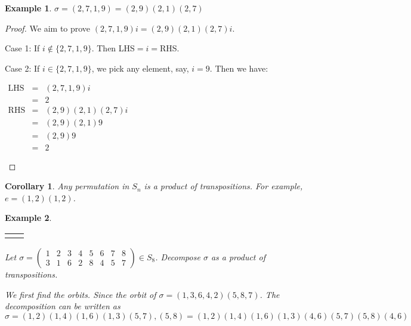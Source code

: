 \documentclass{article}
\theoremstyle{MyNonumberplain}
\theoremstyle{break}
\newtheorem*{proof}{Proof. }
\newcommand{\nline}{\begin{tabular}{ll}&\\\end{tabular}}
\newcommand{\nin}{\not\in}
\newcommand{\tmop}{\text}
\theoremstyle{break}
\newtheorem{corollary}{Corollary}[theorem]
\newtheorem{example}{Example}[section]
\theoremstyle{break}
\theoremstyle{definition}
\theoremstyle{break}
\begin{document}
\begin{expbox}
    \begin{example}
        $\sigma = (2, 7, 1, 9) = (2, 9) (2, 1) (2, 7)$
    \end{example}
    \begin{prfbox}
        \begin{proof}
            We aim to prove $(2, 7, 1, 9) i = (2, 9) (2, 1) (2, 7) i$.\bigskip

            Case 1: If $i \nin  \{ 2, 7, 1, 9 \}$. Then LHS$=i=$RHS.\bigskip

            Case 2: If $i \in \{ 2, 7, 1, 9 \}$, we pick any element, say, $i=9$. Then we have:\bigskip

            \begin{center}
                $\begin{array}{lll}
                    \tmop{LHS} & = & (2, 7, 1, 9) i\\
                    & = & 2\\
                    \tmop{RHS} & = & (2, 9) (2, 1) (2, 7) i\\
                    & = & (2, 9) (2, 1) 9\\
                    & = & (2, 9) 9\\
                    & = & 2
                \end{array}$
            \end{center}
        \end{proof}
    \end{prfbox}
\end{expbox}

\begin{thmbox}
    \begin{corollary}
        Any permutation in $S_n$ is a product of transpositions. For example, $e=(1,2)(1,2)$.
    \end{corollary}
\end{thmbox}

\begin{expbox}
    \begin{example}

        \nline

        Let $\sigma = \left(\begin{array}{cccccccc}
            1 & 2 & 3 & 4 & 5 & 6 & 7 & 8\\
            3 & 1 & 6 & 2 & 8 & 4 & 5 & 7
        \end{array}\right) \in S_8$. Decompose $\sigma$ as a product of
        transpositions.

        \begin{ansbox}
            We first find the orbits. Since the orbit of $\sigma = (1, 3, 6, 4, 2) (5, 8,
            7)$. The decomposition can be written as
            \[ \sigma = (1, 2) (1, 4) (1, 6) (1, 3) (5, 7), (5, 8) = (1, 2) (1, 4) (1, 6)
            (1, 3) (4, 6) (5, 7) (5, 8) (4, 6) \]
    
        \end{ansbox}

    \end{example}
\end{expbox}
\end{document}
